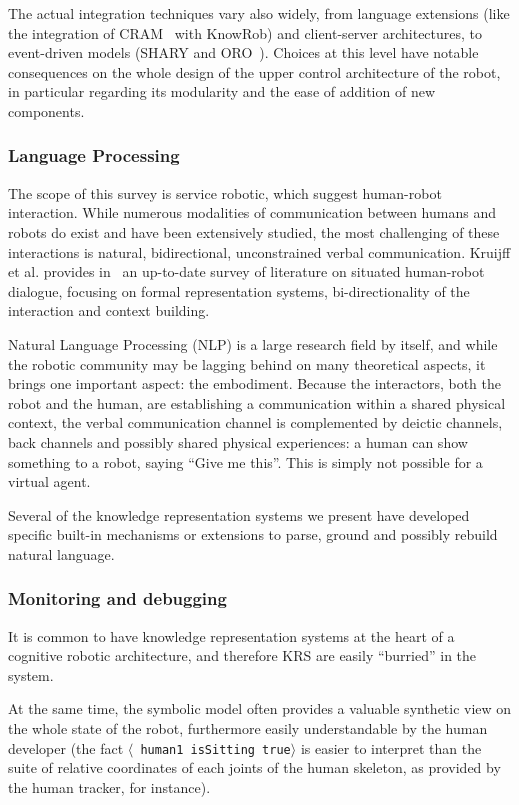 \documentclass[a4paper, twocolumn]{article}
\newcommand{\stmt}[1]{{\footnotesize \tt $\langle$ #1\relax$\rangle$}}
\begin{document}
The actual integration techniques vary also widely, from language extensions
(like the integration of CRAM~\cite{Beetz2010} with KnowRob) and client-server
architectures, to event-driven models (SHARY and ORO~\cite{Alami2011}). Choices
at this level have notable consequences on the whole design of the upper
control architecture of the robot, in particular regarding its modularity and
the ease of addition of new components.

\subsubsection{Language Processing}
\label{sect|nlp}

The scope of this survey is service robotic, which suggest human-robot
interaction. While numerous modalities of communication between humans and
robots do exist and have been extensively studied, the most challenging of
these interactions is natural, bidirectional, unconstrained verbal
communication. Kruijff et al. provides in~\cite{Kruijff2010} an up-to-date
survey of literature on situated human-robot dialogue, focusing on formal
representation systems, bi-directionality of the interaction and context
building.

Natural Language Processing (NLP) is a large research field by itself, and
while the robotic community may be lagging behind on many theoretical aspects,
it brings one important aspect: the embodiment. Because the interactors, both
the robot and the human, are establishing a communication within a shared
physical context, the verbal communication channel is complemented by deictic
channels, back channels and possibly shared physical experiences: a human can
show something to a robot, saying ``Give me this''. This is simply not possible
for a virtual agent.

Several of the knowledge representation systems we present have developed
specific built-in mechanisms or extensions to parse, ground and possibly
rebuild natural language.

\subsubsection{Monitoring and debugging}
\label{sect|debugging}

It is common to have knowledge representation systems at the heart of a
cognitive robotic architecture, and therefore KRS are easily ``burried'' in the
system.

At the same time, the symbolic model often provides a valuable synthetic view
on the whole state of the robot, furthermore easily understandable by the human
developer (the fact \stmt{human1 isSitting true} is easier to interpret than
the suite of relative coordinates of each joints of the human skeleton, as
provided by the human tracker, for instance).
\end{document}
